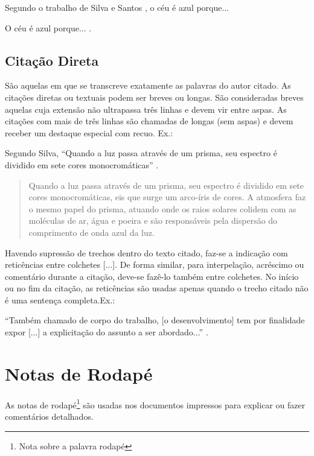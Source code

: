 Segundo o trabalho de Silva e Santos \citeyearpar{artigo}, o céu é azul porque...

O céu é azul porque... \cite{artigo}.

\subsection{Citação Direta}
São aquelas em que se transcreve exatamente as palavras do autor citado. As citações diretas ou textuais podem ser breves ou longas. São consideradas breves aquelas cuja extensão não ultrapassa três linhas e devem vir entre aspas. As citações com mais de três linhas são chamadas de longas (sem aspas) e devem receber um destaque especial com recuo.  Ex.:

Segundo Silva, ``Quando a luz passa através de um prisma, seu espectro é dividido em sete cores monocromáticas'' \citeyearpar{artigo}.

\begin{quote}
Quando a luz passa através de um prisma, seu espectro é dividido em sete cores monocromáticas, eis que surge um arco-íris de cores. A atmosfera faz o mesmo papel do prisma, atuando onde os raios solares colidem com as moléculas de ar, água e poeira e são responsáveis pela dispersão do comprimento de onda azul da luz. \cite{artigo}
\end{quote}

Havendo supressão de trechos dentro do texto citado, faz-se a indicação com reticências entre colchetes [...]. De forma similar, para interpelação, acréscimo ou comentário durante a citação, deve-se fazê-lo também entre colchetes. No início ou no fim da citação, as reticências são usadas apenas quando o trecho citado não é uma sentença completa.Ex.:

``Também chamado de corpo do trabalho, [o desenvolvimento] tem por finalidade expor [...] a explicitação do assunto a ser abordado...'' \cite{artigo}.

\section{Notas de Rodapé}
As notas de rodapé\footnote{Nota sobre a palavra rodapé} são usadas nos documentos impressos para explicar ou fazer comentários detalhados.
